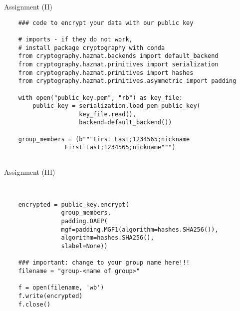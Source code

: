 \begin{frame}[fragile]{Assignment (II)}

	\begin{verbatim}
	### code to encrypt your data with our public key

	# imports - if they do not work,
	# install package cryptography with conda
	from cryptography.hazmat.backends import default_backend
	from cryptography.hazmat.primitives import serialization
	from cryptography.hazmat.primitives import hashes
	from cryptography.hazmat.primitives.asymmetric import padding

	with open("public_key.pem", "rb") as key_file:
	    public_key = serialization.load_pem_public_key(
	                 key_file.read(),
	                 backend=default_backend())

	group_members = (b"""First Last;1234565;nickname
                 First Last;1234565;nickname""")


	\end{verbatim}

\end{frame}

\begin{frame}[fragile]{Assignment (III)}

	\begin{verbatim}


	encrypted = public_key.encrypt(
                group_members,
                padding.OAEP(
                mgf=padding.MGF1(algorithm=hashes.SHA256()),
                algorithm=hashes.SHA256(),
                slabel=None))

	### important: change to your group name here!!!
	filename = "group-<name of group>"

	f = open(filename, 'wb')
	f.write(encrypted)
	f.close()
	\end{verbatim}

	\end{frame}


